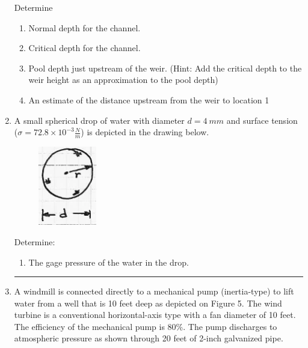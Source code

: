 \documentclass[12pt]{article}
\begin{document}
\begin{enumerate}
Determine
\begin{enumerate}
\item Normal depth for the channel.
\item Critical depth for the channel.
\item Pool depth just upstream of the weir. (Hint: Add the critical depth to the weir height as an approximation to the pool depth)
\item An estimate of the distance upstream from the weir to location 1 
\end{enumerate}
\clearpage

\item A small spherical drop of water with diameter $d=4~mm$  and surface tension ($\sigma = 72.8 \times 10^{-3} \frac{N}{m}$) is depicted in the drawing below.

\begin{figure}[h!] %
   \centering
   \includegraphics[width=1in]{drop.png} 
   \caption{}
   \label{fig:drop}
\end{figure}

Determine:
\begin{enumerate}
\item The gage pressure of the water in the drop.
\end{enumerate}
\noindent\rule{\linewidth}{0.4pt}
\clearpage

\item A windmill is connected directly to a mechanical pump (inertia-type) to lift water from a well that is 10 feet deep as depicted on Figure 5.  The wind turbine is a conventional horizontal-axis type with a fan diameter of 10 feet.  The efficiency of the mechanical pump is 80\%. The pump discharges to atmospheric pressure as shown through 20 feet of 2-inch galvanized pipe.


\end{enumerate}
\end{document}
